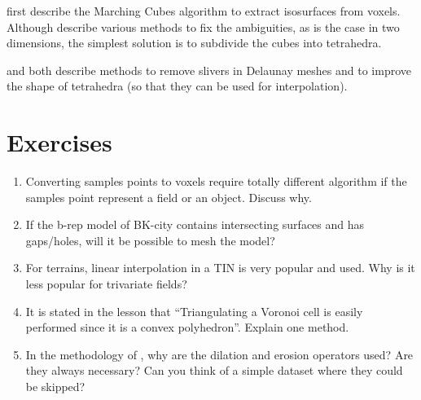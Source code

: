 \citet{Lorensen87} first describe the Marching Cubes algorithm to extract isosurfaces from voxels.
Although \citet{Wilhems90} describe various methods to fix the ambiguities, as is the case in two dimensions, the simplest solution is to subdivide the cubes into tetrahedra.

\citet{Cheng00} and \citet{Miller02} both describe methods to remove slivers in Delaunay meshes and to improve the shape of tetrahedra (so that they can be used for interpolation).

%
\section{Exercises}

\begin{enumerate}
  \item Converting samples points to voxels require totally different algorithm if the samples point represent a field or an object. Discuss why.
  \item If the b-rep model of BK-city contains intersecting surfaces and has gaps/holes, will it be possible to mesh the model?
  \item For terrains, linear interpolation in a TIN is very popular and used. Why is it less popular for trivariate fields?
  \item It is stated in the lesson that ``Triangulating a Voronoi cell is easily performed since it is a convex polyhedron''. Explain one method.
  \item In the methodology of \citet{Donkers16}, why are the dilation and erosion operators used? Are they always necessary? Can you think of a simple dataset where they could be skipped?
\end{enumerate}
